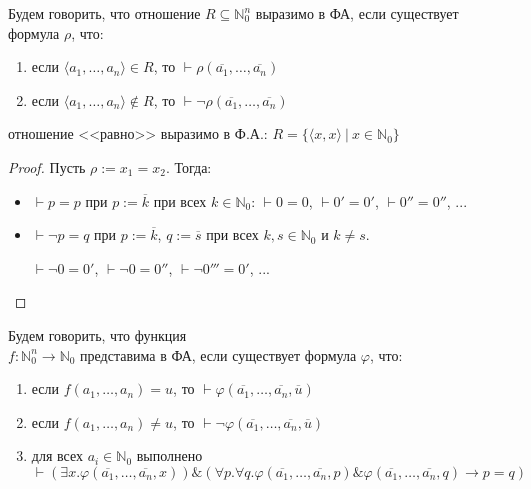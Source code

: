 \begin{definition}

    Будем говорить, что отношение $R\subseteq \mathbb{N}^n_0$ выразимо в ФА,
если существует формула $\rho$, что:
\begin{enumerate}
\item если $\langle a_1,\dots,a_n \rangle \in R$, то $\vdash \rho(\overline{a_1},\dots,\overline{a_n})$
\item если $\langle a_1,\dots,a_n \rangle \notin R$, то $\vdash \neg\rho(\overline{a_1},\dots,\overline{a_n})$
\end{enumerate}
\end{definition}

\begin{theorem} отношение <<равно>> выразимо в Ф.А.:
$R = \{ \langle x,x \rangle\ |\ x \in \mathbb{N}_0 \}$
\end{theorem}

\begin{proof}
Пусть $\rho := x_1=x_2$.  Тогда:
\begin{itemize}
\item $\vdash p = p$ при $p := \overline{k}$ при всех $k \in \mathbb{N}_0$:  $\vdash 0=0$, $\vdash 0'=0'$, $\vdash 0''=0''$, ...
\item $\vdash \neg p = q$ при $p := \overline{k}$, $q := \overline{s}$ при всех $k,s \in \mathbb{N}_0$ и $k \ne s$.

 $\vdash \neg 0 = 0'$, $\vdash \neg 0 = 0''$, $\vdash \neg 0''' = 0'$, ...
\end{itemize}
\end{proof}

\begin{definition}
  Будем говорить, что функция \\$f: \mathbb{N}^n_0\to\mathbb{N}_0$ представима в ФА,
если существует формула $\varphi$, что:
\begin{enumerate}
\item если $f(a_1,\dots,a_n) = u$, то $\vdash \varphi(\overline{a_1},\dots,\overline{a_n},\overline{u})$
\item если $f(a_1,\dots,a_n) \ne u$, то $\vdash \neg\varphi(\overline{a_1},\dots,\overline{a_n},\overline{u})$
\item для всех $a_i \in \mathbb{N}_0$ выполнено $\vdash (\exists x.\varphi(\overline{a_1},\dots,\overline{a_n},x)) \&
   (\forall p.\forall q.\varphi(\overline{a_1},\dots,\overline{a_n},p)\& \varphi(\overline{a_1},\dots,\overline{a_n},q)\rightarrow p=q)$
\end{enumerate}
\end{definition}


